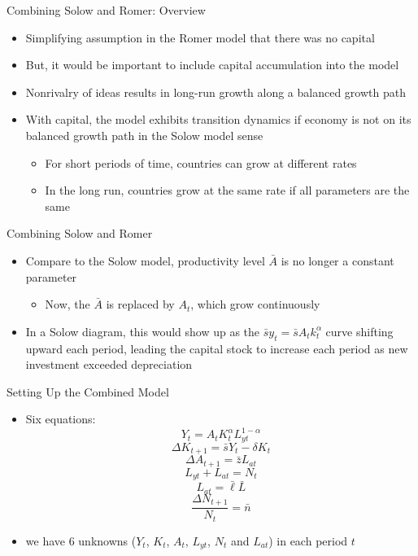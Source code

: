 \documentclass[aspectratio=1610]{beamer}
\begin{document}
\begin{frame}[wide]{Combining Solow and Romer: Overview}
	\begin{itemize}
		\item Simplifying assumption in the Romer model that there was no capital
		\item But, it would be important to include capital accumulation into the model
		\item Nonrivalry of ideas results in long-run growth along a balanced growth path
		\item With capital, the model exhibits transition dynamics if economy is not on its balanced growth path in the Solow model sense
		\vspace{1mm}
		\begin{itemize}
			\item For short periods of time, countries can grow at different rates
			\item In the long run, countries grow at the same rate if all parameters are the same
		\end{itemize}
	\end{itemize}
\end{frame}

\begin{frame}[wide]{Combining Solow and Romer}
	\begin{itemize}
		\item Compare to the Solow model, productivity level $\bar{A}$ is no longer a constant parameter
		\vspace{2mm}
		\begin{itemize}
			\item Now, the $\bar{A}$ is replaced by $A_t$, which grow continuously
		\end{itemize}
		\vspace{4mm}
		\item In a Solow diagram, this would show up as the $\bar{s}y_t = \bar{s}A_t k^\alpha_t$ curve shifting upward each period, leading the capital stock to increase each period as new investment exceeded depreciation
	\end{itemize}
\end{frame}

\begin{frame}[wide]{Setting Up the Combined Model}
	\begin{itemize}
		\item Six equations:
		\[Y_t = A_t K_t^{\alpha} L_{yt}^{1-\alpha}\]
		\[\Delta K_{t+1}  = \bar{s} Y_t - \delta K_t\]
		\[\Delta A_{t+1} = \bar{z} L_{at}\]
		\[L_{yt} + L_{at} = N_t\]
		\[L_{at} = \bar{\ell} \bar{L}\]
		\[\frac{\Delta N_{t+1}}{N_t} = \bar{n}\]
		\vspace{3mm}
		\item  we have 6 unknowns ($Y_t$, $K_t$, $A_t$, $L_{yt}$, $N_t$ and $L_{at}$) in each period $t$
	\end{itemize}
\end{frame}
\end{document}
